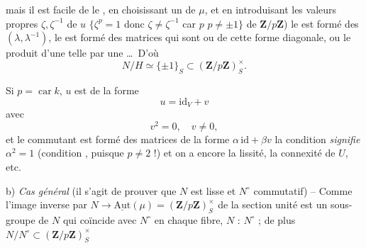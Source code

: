 \documentclass[11pt,a4paper]{article}
\begin{document}
mais il est facile de le , en choisissant un
 de $\mu$, et en introduisant les valeurs propres
$\zeta, \zeta^{-1}$ de $u$ \ill{} $\lbrace \zeta^{p} = 1$
donc $\zeta \neq \zeta^{-1}$ car $p$  $p \neq \pm 1\rbrace$
 \ill{}  de $\mathbf{Z}/p\mathbf{Z}$) le
  est formé des $(\lambda, \lambda^{-1})$, le
 est formé des matrices qui sont ou de cette forme
diagonale, ou le produit d'une telle par une  \ldots\ D'où
\[
  N/H \simeq \lbrace \pm 1 \rbrace_{S} \subset (\mathbf{Z}/p\mathbf{Z})^{\times}_{S} .
\]

Si $p = \operatorname{car} k$,  $u$ est de la forme
\[
  u = \mathrm{id}_V + v
\]
avec \struck{\ill{}}
\[
  v^2 = 0, \quad v \neq 0 ,
\]
et le commutant est formé des matrices \emph{} de la
forme $\alpha\,\mathrm{id} + \beta v$  la condition  \emph{signifie} $\alpha^2 = 1$
(condition \ill{} , puisque $p \neq 2$ !)
et on a encore la lissité, la connexité de $U$, etc.

b) \emph{Cas général} (il s'agit de prouver que $N$ est lisse et $N^{\circ}$
commutatif) -- Comme 
l'image inverse par $N \to \underline{\mathrm{Aut}}(\mu) = (\mathbf{Z}/p\mathbf{Z})^{\times}_S$
de la section unité est un sous-groupe  de $N$ qui coïncide
avec $N^{\circ}$ en chaque fibre, $N$ \ill{}  : $N^{\circ}$ ; de plus
$N/N^{\circ} \subset (\mathbf{Z}/p\mathbf{Z})^{\times}_S$ \ill{}
\end{document}
